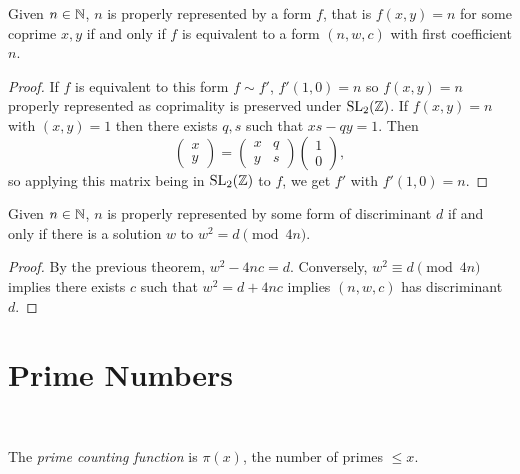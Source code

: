 \documentclass[a4paper, 10pt, twocolumn]{amsart}
\begin{document}

\begin{theorem}
    Given $n \in \mathbb{N}$, $n$ is properly represented by a form $f$, that is $f(x,y) = n$ for some coprime $x, y$
if and only if $f$ is equivalent to a form $(n, w, c)$ with first coefficient $n$.
    \end{theorem} 
\begin{proof}
    If $f$ is equivalent to this form $f \sim f'$, $f'(1, 0) = n$ so $f(x, y) = n$ properly represented as coprimality is preserved under $\operatorname{SL}_2(\mathbb{Z})$. 
    If $f(x, y) = n$ with $(x, y) = 1$ then there exists $q, s$ such that $xs - qy = 1$. Then
    $$
    \begin{pmatrix}
        x \\ y
    \end{pmatrix} = \begin{pmatrix}
        x & q \\ y & s
    \end{pmatrix} \begin{pmatrix}
        1 \\ 0
    \end{pmatrix},
    $$ 
    so applying this matrix being in $\operatorname{SL}_2(\mathbb{Z})$ to $f$, we get $f'$ with $f'(1, 0) = n$.
\end{proof}

\begin{theorem}
    Given $n \in \mathbb{N}$, $n$ is properly represented by some form of discriminant $d$ if and only if there is a solution $w$ to $w^2 = d\pmod{4n}$. 
\end{theorem}
\begin{proof}
    By the previous theorem, $w^2 - 4nc = d$. Conversely, $w^2 \equiv d\pmod{4n}$ implies there exists $c$ such that $w^2 = d + 4nc$ implies $(n, w, c)$ has discriminant $d$.
\end{proof}


\section{Prime Numbers}
\ 

\begin{definition}
The \emph{prime counting function} is $\pi(x)$, the number of primes $\leq x$.
\end{definition}
\end{document}
